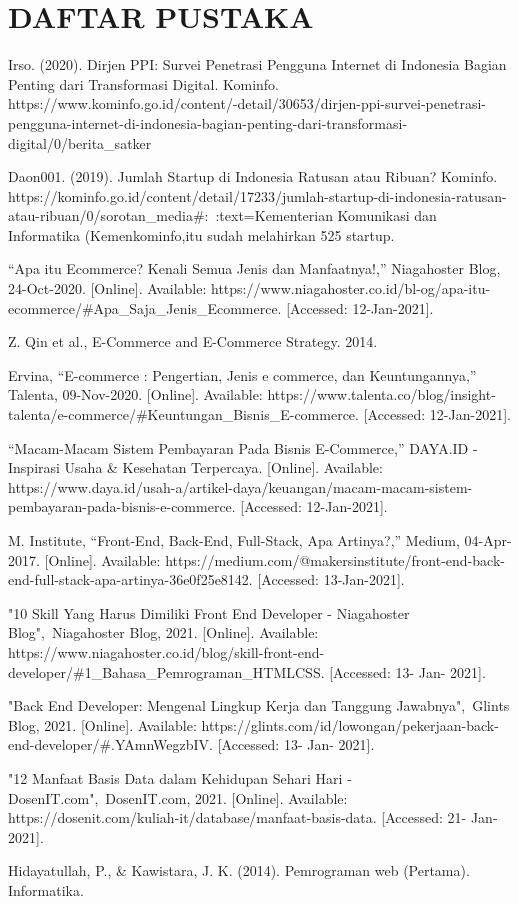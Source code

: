 \chapter*{DAFTAR PUSTAKA}
\fancyhf{}
\renewcommand{\headrulewidth}{0pt}
\begin{enumerate}[label={[\arabic*]}]
	\item Irso. (2020). Dirjen PPI: Survei Penetrasi Pengguna Internet di Indonesia Bagian Penting dari Transformasi Digital. Kominfo. https://www.kominfo.go.id/content/-detail/30653/dirjen-ppi-survei-penetrasi-pengguna-internet-di-indonesia-bagian-penting-dari-transformasi-digital/0/berita\_satker
	\item Daon001. (2019). Jumlah Startup di Indonesia Ratusan atau Ribuan? Kominfo. https://kominfo.go.id/content/detail/17233/jumlah-startup-di-indonesia-ratusan-atau-ribuan/0/sorotan\_media\#:~:text=Kementerian Komunikasi dan Informatika (Kemenkominfo,itu sudah melahirkan 525 startup.
	\item “Apa itu Ecommerce? Kenali Semua Jenis dan Manfaatnya!,” Niagahoster Blog, 24-Oct-2020. [Online]. Available: https://www.niagahoster.co.id/bl-og/apa-itu-ecommerce/\#Apa\_Saja\_Jenis\_Ecommerce. [Accessed: 12-Jan-2021]. 
	\item Z. Qin et al., E-Commerce and E-Commerce Strategy. 2014.
	\item Ervina, “E-commerce : Pengertian, Jenis e commerce, dan Keuntungannya,” Talenta, 09-Nov-2020. [Online]. Available: https://www.talenta.co/blog/insight-talenta/e-commerce/\#Keuntungan\_Bisnis\_E-commerce. [Accessed: 12-Jan-2021]. 
	\item “Macam-Macam Sistem Pembayaran Pada Bisnis E-Commerce,” DAYA.ID - Inspirasi Usaha \& Kesehatan Terpercaya. [Online]. Available: https://www.daya.id/usah-a/artikel-daya/keuangan/macam-macam-sistem-pembayaran-pada-bisnis-e-commerce. [Accessed: 12-Jan-2021]. 
	\item M. Institute, “Front-End, Back-End, Full-Stack, Apa Artinya?,” Medium, 04-Apr-2017. [Online]. Available: https://medium.com/@makersinstitute/front-end-back-end-full-stack-apa-artinya-36e0f25e8142. [Accessed: 13-Jan-2021]. 
	\item "10 Skill Yang Harus Dimiliki Front End Developer - Niagahoster Blog", Niagahoster Blog, 2021. [Online]. Available: https://www.niagahoster.co.id/blog/skill-front-end-developer/\#1\_Bahasa\_Pemrograman\_HTMLCSS. [Accessed: 13- Jan- 2021].
	\item "Back End Developer: Mengenal Lingkup Kerja dan Tanggung Jawabnya", Glints Blog, 2021. [Online]. Available: https://glints.com/id/lowongan/pekerjaan-back-end-developer/\#.YAmnWegzbIV. [Accessed: 13- Jan- 2021].
	\item "12 Manfaat Basis Data dalam Kehidupan Sehari Hari - DosenIT.com", DosenIT.com, 2021. [Online]. Available: https://dosenit.com/kuliah-it/database/manfaat-basis-data. [Accessed: 21- Jan- 2021].
	\item Hidayatullah, P., \& Kawistara, J. K. (2014). Pemrograman web (Pertama). Informatika.
\end{enumerate}